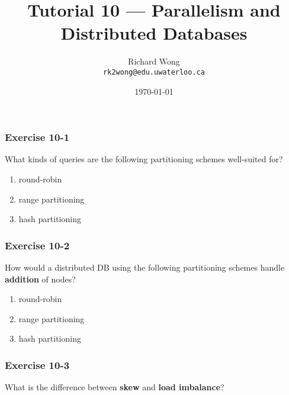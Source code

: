 

\def\ojoin{\setbox0=\hbox{$\bowtie$}%
  \rule[-.02ex]{.25em}{.4pt}\llap{\rule[\ht0]{.25em}{.4pt}}}
\def\leftouterjoin{\mathbin{\ojoin\mkern-5.8mu\bowtie}}

\title{Tutorial 10 --- Parallelism and Distributed Databases }

\author{Richard Wong \\ \small \texttt{rk2wong@edu.uwaterloo.ca}}
\date{\today}




\begin{frame}
  \titlepage

\end{frame}


\begin{frame}
\frametitle{Exercise 10-1}

What kinds of queries are the following partitioning schemes well-suited for?

\begin{enumerate}
  \item round-robin
  \item range partitioning
  \item hash partitioning
\end{enumerate}

\end{frame}


\begin{frame}
\frametitle{Exercise 10-2}

How would a distributed DB using the following partitioning schemes handle \textbf{addition} of nodes?

\begin{enumerate}
  \item round-robin
  \item range partitioning
  \item hash partitioning
\end{enumerate}

\end{frame}


\begin{frame}
\frametitle{Exercise 10-3}

What is the difference between \textbf{skew} and \textbf{load imbalance}?

\end{frame}



